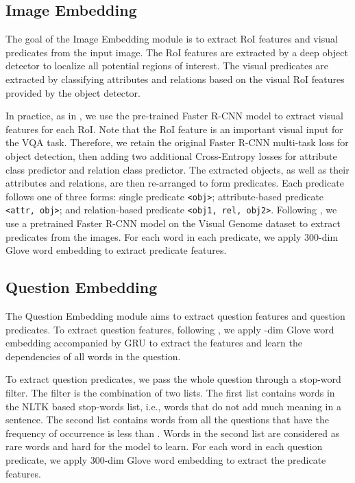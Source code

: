 \documentclass[10pt,twocolumn,letterpaper]{article}
\begin{document}
\subsection{Image Embedding}
\label{subsec_image_embedding}

The goal of the Image Embedding module is to extract RoI features and visual predicates from the input image. The RoI features are extracted by a deep object detector to localize all potential regions of interest. The visual predicates are extracted by classifying attributes and relations based on the visual RoI features provided by the object detector.

In practice, as in \cite{Kim2018BilinearAN, tip-trick}, we use the pre-trained Faster R-CNN model \cite{bottom-up2017} to extract visual features for each RoI. Note that the RoI feature is an important visual input for the VQA task. Therefore, we retain the original Faster R-CNN multi-task loss for object detection, then adding two additional Cross-Entropy losses for attribute class predictor and relation class predictor. The extracted objects, as well as their attributes and relations, are then re-arranged to form predicates. Each predicate follows one of three forms: single predicate \texttt{<obj>}; attribute-based predicate \texttt{<attr, obj>}; and relation-based predicate \texttt{<obj1, rel, obj2>}. Following \cite{Kim2018BilinearAN, tip-trick, li2019regat}, we use a pretrained Faster R-CNN model on the Visual Genome dataset \cite{visualgenome} to extract predicates from the images. For each word in each predicate, we apply 300-dim Glove word embedding \cite{pennington2014glove} to extract predicate features.








\subsection{Question Embedding}

\label{subsec_question_embedding}

The Question Embedding module aims to extract question features and question predicates. To extract question features, following \cite{Kim2018BilinearAN, do2019cti, yu2019mcan}, we apply -dim Glove word embedding \cite{pennington2014glove} accompanied by GRU \cite{2014ChoGRU} to extract the features and learn the dependencies of all words in the question. 

To extract question predicates, we pass the whole question through a stop-word filter. The filter is the combination of two lists. The first list contains words in the NLTK based stop-words \cite{loper2002nltk} list, i.e., words that do not add much meaning in a sentence.  The second list contains words from all the questions that have the frequency of occurrence is less than . Words in the second list are considered as rare words and hard for the model to learn. For each word in each question predicate, we apply 300-dim Glove word embedding \cite{pennington2014glove} to extract the predicate features.
\end{document}
